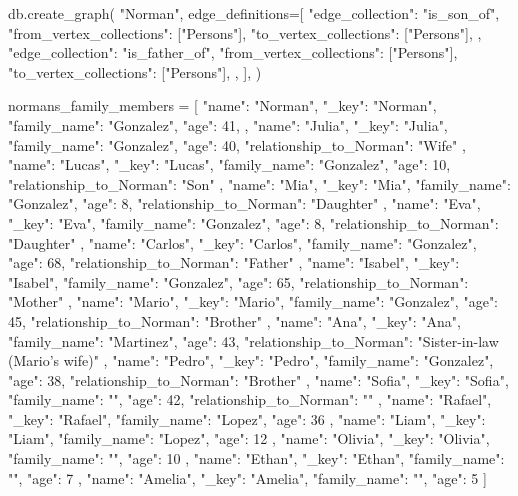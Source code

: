 \begin{APACode}
db.create_graph(
    "Norman",
    edge_definitions=[
        {
            "edge_collection": "is_son_of",
            "from_vertex_collections": ["Persons"],
            "to_vertex_collections": ["Persons"],
        },
        {
            "edge_collection": "is_father_of",
            "from_vertex_collections": ["Persons"],
            "to_vertex_collections": ["Persons"],
        },
    ],
)

normans_family_members = [
    {
        "name": "Norman",
        "_key": "Norman",
        "family_name": "Gonzalez",
        "age": 41,
    },
    {
        "name": "Julia",
        "_key": "Julia",
        "family_name": "Gonzalez",
        "age": 40,
        "relationship_to_Norman": "Wife"
    },
    {
        "name": "Lucas",
        "_key": "Lucas",
        "family_name": "Gonzalez",
        "age": 10,
        "relationship_to_Norman": "Son"
    },
    {
        "name": "Mia",
        "_key": "Mia",
        "family_name": "Gonzalez",
        "age": 8,
        "relationship_to_Norman": "Daughter"
    },
    {
        "name": "Eva",
        "_key": "Eva",
        "family_name": "Gonzalez",
        "age": 8,
        "relationship_to_Norman": "Daughter"
    },
    {
        "name": "Carlos",
        "_key": "Carlos",
        "family_name": "Gonzalez",
        "age": 68,
        "relationship_to_Norman": "Father"
    },
    {
        "name": "Isabel",
        "_key": "Isabel",
        "family_name": "Gonzalez",
        "age": 65,
        "relationship_to_Norman": "Mother"
    },
    {
        "name": "Mario",
        "_key": "Mario",
        "family_name": "Gonzalez",
        "age": 45,
        "relationship_to_Norman": "Brother"
    },
    {
        "name": "Ana",
        "_key": "Ana",
        "family_name": "Martinez",
        "age": 43,
        "relationship_to_Norman": "Sister-in-law (Mario's wife)"
    },
    {
        "name": "Pedro",
        "_key": "Pedro",
        "family_name": "Gonzalez",
        "age": 38,
        "relationship_to_Norman": "Brother"
    },
    {
        "name": "Sofia",
        "_key": "Sofia",
        "family_name": "",
        "age": 42,
        "relationship_to_Norman": ""
    },
    {
        "name": "Rafael",
        "_key": "Rafael",
        "family_name": "Lopez",
        "age": 36
    },
    {
        "name": "Liam",
        "_key": "Liam",
        "family_name": "Lopez",
        "age": 12
    },
    {
        "name": "Olivia",
        "_key": "Olivia",
        "family_name": "",
        "age": 10
    },
    {
        "name": "Ethan",
        "_key": "Ethan",
        "family_name": "",
        "age": 7
    },
    {
        "name": "Amelia",
        "_key": "Amelia",
        "family_name": "",
        "age": 5
    }
]


\end{APACode}
